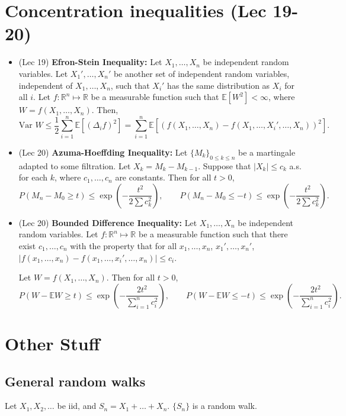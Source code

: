 \documentclass[twoside]{article}
\newcommand\bbE{\mathbb{E}}
\newcommand\bbR{\mathbb{R}}
\newcommand\Dlt{\Delta}
\newcommand\var{\text{Var }}
\begin{document}
\section*{Concentration inequalities (Lec 19-20)}
\begin{itemize}
\item (Lec 19) \textbf{Efron-Stein Inequality:} Let $X_1, \dots, X_n$ be independent random variables. Let $X_1', \dots, X_n'$ be another set of independent random variables, independent of $X_1, \dots, X_n$, such that $X_i'$ has the same distribution as $X_i$ for all $i$. Let $f: \bbR^n \mapsto \bbR$ be a measurable function such that $\bbE [W^2] < \infty$, where $W = f(X_1, \dots, X_n)$. Then,
\begin{equation*} 
\var W \leq \frac{1}{2} \sum_{i=1}^n \bbE \left[ (\Dlt_i f)^2 \right] = \sum_{i=1}^n \bbE \left[ (f(X_1, \dots, X_n) - f(X_1, \dots, X_i', \dots, X_n))^2 \right].
\end{equation*}

\item (Lec 20) \textbf{Azuma-Hoeffding Inequality:} Let $\{ M_k\}_{0 \leq k \leq n}$ be a martingale adapted to some filtration. Let $X_k = M_k - M_{k-1}$. Suppose that $|X_k| \leq c_k$ a.s. for each $k$, where $c_1, \dots, c_n$ are constants. Then for all $t > 0$,
\[P(M_n - M_0 \geq t) \leq \exp \left( - \frac{t^2}{2 \sum c_k^2} \right), \qquad
P(M_n - M_0 \leq -t) \leq \exp \left( - \frac{t^2}{2 \sum c_k^2} \right).\]

\item (Lec 20) \textbf{Bounded Difference Inequality:} Let $X_1, \dots, X_n$ be independent random variables. Let $f: \bbR^n \mapsto \bbR$ be a measurable function such that there exist $c_1, \dots, c_n$ with the property that for all $x_1, \dots, x_n$, $x_1', \dots, x_n'$,
$|f(x_1, \dots, x_n) - f(x_1, \dots, x_i', \dots, x_n)| \leq c_i$.

Let $W = f(X_1, \dots, X_n)$. Then for all $t > 0$,
\[P (W - \bbE W \geq t) \leq \exp \left( - \frac{2t^2}{ \sum_{i=1}^n c_i^2} \right), \qquad P (W - \bbE W \leq -t) \leq \exp \left( - \frac{2t^2}{ \sum_{i=1}^n c_i^2} \right).\]

\end{itemize}

\section*{Other Stuff}
\subsection*{General random walks}
Let $X_1, X_2, \dots$ be iid, and $S_n = X_1 + \dots + X_n$. $\{S_n\}$ is a random walk.
\end{document}
